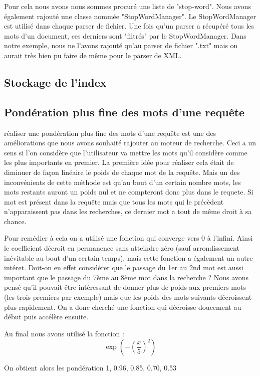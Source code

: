 \documentclass[a4paper,12pt]{article}
\begin{document}
Pour cela nous avons nous sommes procuré une liste de "stop-word". Nous avons également rajouté une classe nommée "StopWordManager". Le StopWordManager est utilisé dans chaque parser de fichier. Une fois qu'un parser a récupéré tous les mots d'un document, ces derniers sont "filtrés" par le StopWordManager. Dans notre exemple, nous ne l'avons rajouté qu'au parser de fichier ".txt" mais on aurait très bien pu faire de même pour le parser de XML.

\subsection{Stockage de l'index}

\subsection{Pondération plus fine des mots d'une requête}

réaliser une pondération plus fine des mots d'une requête est une des améliorations que nous avons souhaité rajouter au moteur de recherche. Ceci a un sens si l'on
considère que l'utilisateur va mettre les mots qu'il considère comme les plus importants en premier. La première idée pour réaliser cela était de diminuer de façon linéaire le poids de chaque mot de la requête.
Mais un des inconvénients de cette méthode est qu'au bout d'un certain nombre mots, les mots restants auront un poids nul et ne compteront donc plus dans le requete. Si mot est présent dans la requête mais que tous les mots qui le précèdent n'apparaissent pas dans les recherches, ce dernier mot a tout de même droit à sa chance.

Pour remédier à cela on a utilisé une fonction qui converge vers 0 à l'infini. Ainsi le coefficient décroit en permanence sans atteindre zéro (sauf arrondissement inévitable au bout d'un certain temps).
mais cette fonction a également un autre intéret. Doit-on en effet considérer que le passage du 1er au 2nd mot est aussi important que le passage du 7ème au 8ème mot dans la recherche ? Nous avons pensé qu'il pouvait-être
intéressant de donner plus de poids aux premiers mots (les trois premiers par exemple) mais que les poids des mots suivants décroissent plus rapidement. On a donc cherché une fonction qui décroisse doucement au début puis accélère ensuite.

Au final nous avons utilisé la fonction : \[\exp(-(\frac{x}{5})^{2})\]

On obtient alors les pondération 1, 0.96, 0.85, 0.70, 0.53
\end{document}
